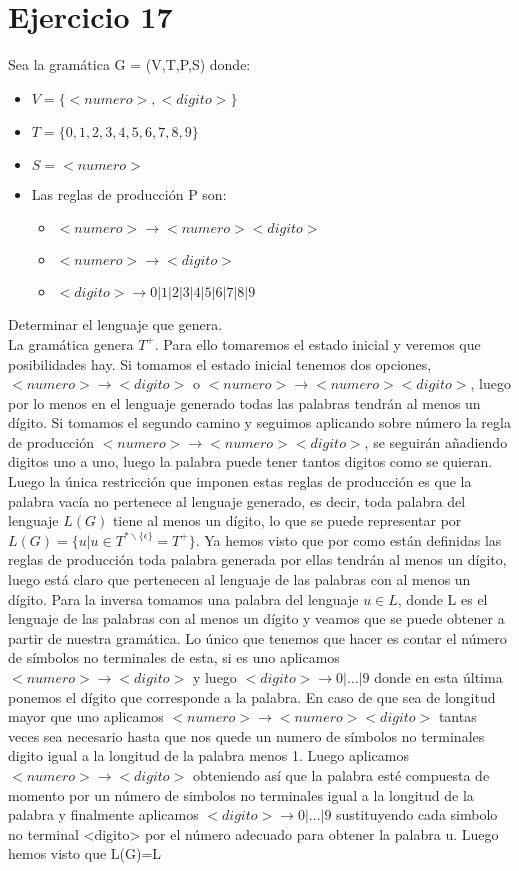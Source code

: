 \documentclass[a4paper,11pt]{article}
\begin{document}
\section{Ejercicio 17}
Sea la gramática G = (V,T,P,S) donde:
\begin{itemize}
\item $V = \{<numero>,<digito>\}$
\item $T = \{0,1,2,3,4,5,6,7,8,9\}$
\item $S = <numero>$
\item Las reglas de producción P son: 
	\begin{itemize}
		\item $<numero> \rightarrow <numero><digito>$
		\item $<numero> \rightarrow <digito>$
		\item $<digito> \rightarrow 0|1|2|3|4|5|6|7|8|9$
	\end{itemize}
\end{itemize}

Determinar el lenguaje que genera. \\

La gramática genera $T^+$.
Para ello tomaremos el estado inicial y veremos que posibilidades hay. Si tomamos el estado inicial tenemos dos opciones, $<numero>\rightarrow <digito>$ o $<numero> \rightarrow <numero><digito>$, luego por lo menos en el lenguaje generado todas las palabras tendrán al menos un dígito. Si tomamos el segundo camino y seguimos aplicando sobre número la regla de producción $<numero> \rightarrow <numero><digito>$, se seguirán añadiendo digitos uno a uno, luego la palabra puede tener tantos digitos como se quieran. Luego la única restricción que imponen estas reglas de producción es que la palabra vacía no pertenece al lenguaje generado, es decir, toda palabra del lenguaje $L(G)$ tiene al menos un dígito, lo que se puede representar por $L(G)=\{u | u \in T^{*\backslash \{\epsilon\}}=T^+\}$. Ya hemos visto que por como están definidas las reglas de producción toda palabra generada por ellas tendrán al menos un dígito, luego está claro que pertenecen al lenguaje de las palabras con al menos un dígito. Para la inversa tomamos una palabra del lenguaje $u \in L$, donde L es el lenguaje de las palabras con al menos un dígito y veamos que se puede obtener a partir de nuestra gramática. Lo único que tenemos que hacer es contar el número de símbolos no terminales de esta, si es uno aplicamos $<numero> \rightarrow <digito>$ y luego $<digito> \rightarrow 0|\ldots|9$ donde en esta última ponemos el dígito que corresponde a la palabra. En caso de que sea de longitud mayor que uno aplicamos $<numero> \rightarrow <numero><digito>$ tantas veces sea necesario hasta que nos quede un numero de símbolos no terminales digito igual a la longitud de la palabra menos 1. Luego aplicamos $<numero> \rightarrow <digito>$ obteniendo así que la palabra esté compuesta de momento por un número de simbolos no terminales igual a la longitud de la palabra y finalmente aplicamos $<digito> \rightarrow 0|\ldots|9$ sustituyendo cada simbolo no terminal <digito> por el número adecuado para obtener la palabra u. Luego hemos visto que L(G)=L
\end{document}
